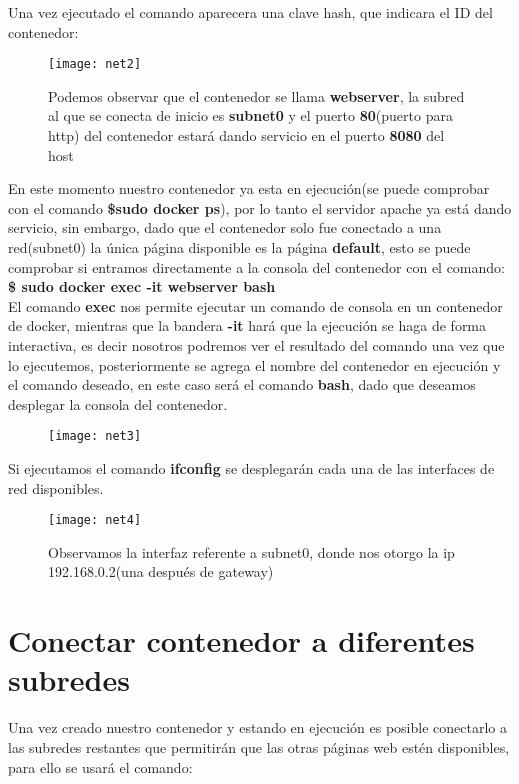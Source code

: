\documentclass[10pt,letterpaper]{article}
\begin{document}
\begin{enumerate}
Una vez ejecutado el comando aparecera una clave hash, que indicara el ID del contenedor:\\

\begin{figure}[h]
\texttt{[image: net2]}
\caption{Podemos observar que el contenedor se llama \textbf{webserver}, la subred al que se conecta de inicio es \textbf{subnet0} y el puerto \textbf{80}(puerto para http) del contenedor estar\'a dando servicio en el puerto \textbf{8080} del host}
\centering
\end{figure}


\clearpage
En este momento nuestro contenedor ya esta en ejecuci\'on(se puede comprobar con el comando \textbf{\$sudo docker ps}), por lo tanto el servidor apache ya est\'a dando servicio, sin embargo, dado que el contenedor solo fue conectado a una red(subnet0) la \'unica p\'agina disponible es la p\'agina \textbf{default}, esto se puede comprobar si entramos directamente a la consola del contenedor con el comando:\\

\textbf{\$ sudo docker exec -it webserver bash}\\
El comando \textbf{exec} nos permite ejecutar un comando de consola en un contenedor de docker, mientras que la bandera \textbf{-it} har\'a que la ejecuci\'on se haga de forma interactiva, es decir nosotros podremos ver el resultado del comando una vez que lo ejecutemos, posteriormente se agrega el nombre del contenedor en ejecuci\'on y el comando deseado, en este caso ser\'a el comando \textbf{bash}, dado que deseamos desplegar la consola del contenedor.

\begin{figure}[h]
\texttt{[image: net3]}
\centering
\end{figure}

Si ejecutamos el comando \textbf{ifconfig} se desplegar\'an cada una de las interfaces de red disponibles.\\

\begin{figure}[h]
\texttt{[image: net4]} \\
\centering
\caption{Observamos la interfaz referente a subnet0, donde nos otorgo la ip 192.168.0.2(una despu\'es de gateway)}
\end{figure}

\clearpage
\section{Conectar contenedor a diferentes subredes}
Una vez creado nuestro contenedor y estando en ejecuci\'on es posible conectarlo a las subredes restantes que permitir\'an que las otras p\'aginas web est\'en disponibles, para ello se usar\'a el comando:\\


\end{enumerate}
\end{document}
